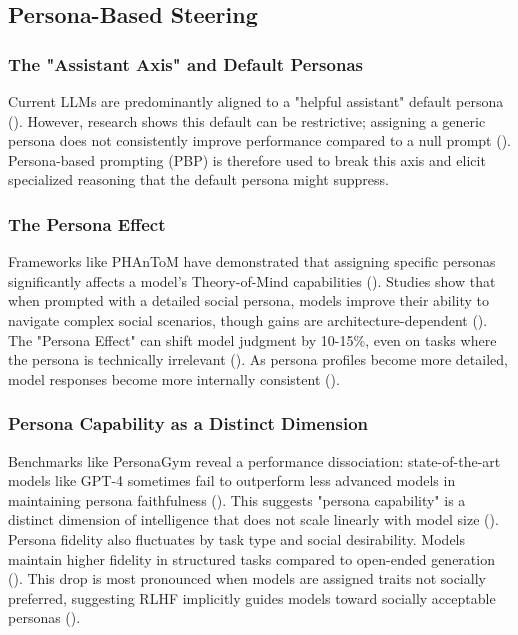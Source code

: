 \documentclass{article}
\begin{document}
\subsection{Persona-Based Steering}

\subsubsection{The "Assistant Axis" and Default Personas}

Current LLMs are predominantly aligned to a "helpful assistant" default persona (\cite{christina_lu_520bd0ae}). However, research shows this default can be restrictive; assigning a generic persona does not consistently improve performance compared to a null prompt (\cite{mingqian_zheng_2dd4a908}). Persona-based prompting (PBP) is therefore used to break this axis and elicit specialized reasoning that the default persona might suppress.

\subsubsection{The Persona Effect}

Frameworks like PHAnToM have demonstrated that assigning specific personas significantly affects a model's Theory-of-Mind capabilities (\cite{gerard_yeo_2544df62}). Studies show that when prompted with a detailed social persona, models improve their ability to navigate complex social scenarios, though gains are architecture-dependent (\cite{jing_yang_699d9c2c}). The "Persona Effect" can shift model judgment by 10-15\%, even on tasks where the persona is technically irrelevant (\cite{tiancheng_hu_49571f40}). As persona profiles become more detailed, model responses become more internally consistent (\cite{yuqing_bai_9d1d72ff}).

\subsubsection{Persona Capability as a Distinct Dimension}

Benchmarks like PersonaGym reveal a performance dissociation: state-of-the-art models like GPT-4 sometimes fail to outperform less advanced models in maintaining persona faithfulness (\cite{vinay_samuel_301ec4c0}). This suggests "persona capability" is a distinct dimension of intelligence that does not scale linearly with model size (\cite{vinay_samuel_301ec4c0}). Persona fidelity also fluctuates by task type and social desirability. Models maintain higher fidelity in structured tasks compared to open-ended generation (\cite{jisu_shin_0a44d92a}). This drop is most pronounced when models are assigned traits not socially preferred, suggesting RLHF implicitly guides models toward socially acceptable personas (\cite{manon_reusens_1659b7a7}).
\end{document}
